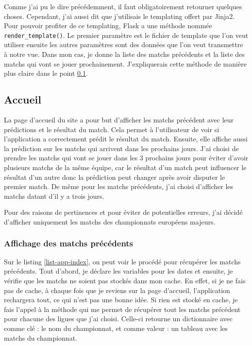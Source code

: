 \documentclass[a4paper,14pt]{extarticle}
\begin{document}
{

Comme j'ai pu le dire précédemment, il faut obligatoirement retourner quelques choses. Cependant, j'ai aussi dit que j'utilisais le templating offert par Jinja2. Pour pouvoir profiter de ce templating, Flask a une méthode nommée \texttt{render\_template()}. Le premier paramètre est le fichier de template que l'on veut utiliser ensuite les autres paramètres sont des données que l'on veut transmettre à notre vue. Dans mon cas, je donne la liste des matchs précédents et la liste des matchs qui vont se jouer prochainement. J'expliquerais cette méthode de manière plus claire dans le point \ref{flaskAccueil}.

\subsection{Accueil}
\label{flaskAccueil}

La page d'accueil du site a pour but d'afficher les matchs précédent avec leur prédictions et le résultat du match. Cela permet à l'utilisateur de voir si l'application a correctement prédit le résultat du match. Ensuite, elle affiche aussi la prédiction sur les matchs qui arrivent dans les prochains jours. J'ai choisi de prendre les matchs qui vont se jouer dans les 3 prochains jours pour éviter d'avoir plusieurs matchs de la même équipe, car le résultat d'un match peut influencer le résultat d'un autre donc la prédiction peut changer après avoir disputer le premier match. De même pour les matchs précédents, j'ai choisi d'afficher les matchs datant d'il y a trois jours.

Pour des raisons de pertinences et pour éviter de potentielles erreurs, j'ai décidé d'afficher uniquement les matchs des championnats européens majeurs.

\subsubsection{Affichage des matchs précédents}

Sur le listing \ref{list-app-index}, on peut voir le procédé pour récupérer les matchs précédents. Tout d'abord, je déclare les variables pour les dates et ensuite, je vérifie que les matchs ne soient pas stockés dans mon cache. En effet, si je ne fais pas de cache, à chaque fois que je reviens sur la page d'accueil, l'application rechargera tout, ce qui n'est pas une bonne idée. Si rien est stocké en cache, je fais l'appel à la méthode qui me permet de récupérer tout les matchs précédent pour chacune des ligues que j'ai choisi. Celle-ci retourne un dictionnaire avec comme clé : le nom du championnat, et comme valeur : un tableau avec les matchs du championnat. 

}
\end{document}
